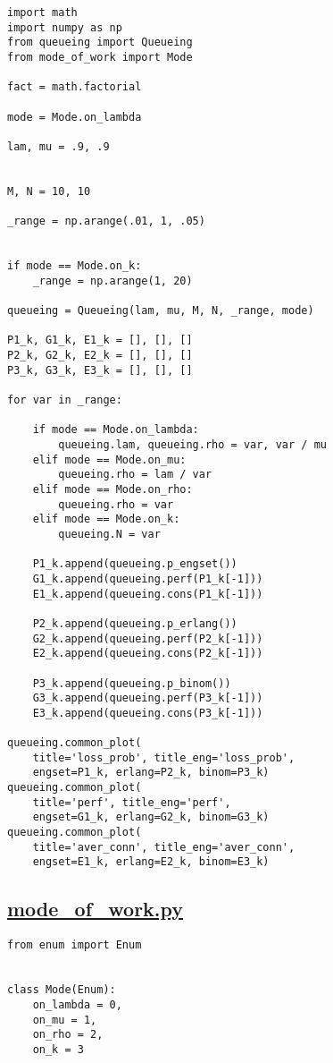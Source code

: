 \documentclass[12pt]{article}
\newcommand\purl[1]{\protect\url{#1}} %
\begin{document}
\begin{lstlisting}
import math
import numpy as np
from queueing import Queueing
from mode_of_work import Mode

fact = math.factorial

mode = Mode.on_lambda

lam, mu = .9, .9


M, N = 10, 10

_range = np.arange(.01, 1, .05)


if mode == Mode.on_k:
    _range = np.arange(1, 20)

queueing = Queueing(lam, mu, M, N, _range, mode)

P1_k, G1_k, E1_k = [], [], []
P2_k, G2_k, E2_k = [], [], []
P3_k, G3_k, E3_k = [], [], []

for var in _range:

    if mode == Mode.on_lambda:
        queueing.lam, queueing.rho = var, var / mu
    elif mode == Mode.on_mu:
        queueing.rho = lam / var
    elif mode == Mode.on_rho:
        queueing.rho = var
    elif mode == Mode.on_k:
        queueing.N = var

    P1_k.append(queueing.p_engset())
    G1_k.append(queueing.perf(P1_k[-1]))
    E1_k.append(queueing.cons(P1_k[-1]))

    P2_k.append(queueing.p_erlang())
    G2_k.append(queueing.perf(P2_k[-1]))
    E2_k.append(queueing.cons(P2_k[-1]))

    P3_k.append(queueing.p_binom())
    G3_k.append(queueing.perf(P3_k[-1]))
    E3_k.append(queueing.cons(P3_k[-1]))

queueing.common_plot(
    title='loss_prob', title_eng='loss_prob',
    engset=P1_k, erlang=P2_k, binom=P3_k)
queueing.common_plot(
    title='perf', title_eng='perf',
    engset=G1_k, erlang=G2_k, binom=G3_k)
queueing.common_plot(
    title='aver_conn', title_eng='aver_conn',
    engset=E1_k, erlang=E2_k, binom=E3_k)

\end{lstlisting}

\subsection{\purl{mode_of_work.py}}
\begin{lstlisting}
from enum import Enum


class Mode(Enum):
    on_lambda = 0,
    on_mu = 1,
    on_rho = 2,
    on_k = 3
\end{lstlisting}
\end{document}

